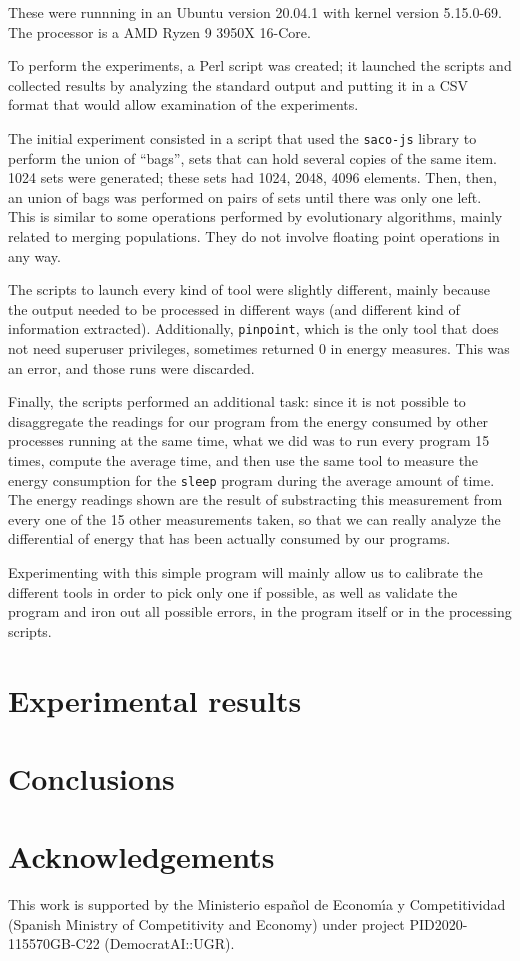 \documentclass[a4paper,twoside]{article}
\begin{document}
These were runnning in an Ubuntu version 20.04.1 with kernel version
5.15.0-69. The processor is a AMD Ryzen 9 3950X 16-Core.

To perform the experiments, a Perl script was created; it launched the scripts
and collected results by analyzing the standard output and putting it in a CSV
format that would allow examination of the experiments.

The initial experiment consisted in a script that used the \texttt{saco-js}
library to perform the union of ``bags'', sets that can hold several copies of
the same item. 1024 sets were generated; these sets had 1024, 2048, 4096
elements. Then, then, an union of bags was performed on pairs of sets until
there was only one left. This is similar to some operations performed by
evolutionary algorithms, mainly related to merging populations. They do not
involve floating point operations in any way.

The scripts to launch every kind of tool were slightly different, mainly because
the output needed to be processed in different ways (and different kind of
information extracted). Additionally, \texttt{pinpoint}, which is the only tool
that does not need superuser privileges, sometimes returned 0 in energy
measures. This was an error, and those runs were discarded.

Finally, the scripts performed an additional task: since it is not possible to
disaggregate the readings for our program from the energy consumed by other
processes running at the same time, what we did was to run every program 15
times, compute the average time, and then use the same tool to measure the
energy consumption for the \texttt{sleep} program during the average amount of
time. The energy readings shown are the result of substracting this measurement
from every one of the 15 other measurements taken, so that we can really analyze
the differential of energy that has been actually consumed by our programs.

Experimenting with this simple program will mainly allow us to calibrate the
different tools in order to pick only one if possible, as well as validate the
program and iron out all possible errors, in the program itself or in the
processing scripts.

\section{Experimental results}
\label{sec:res}

\section{Conclusions}
\label{sec:conc}

\section*{Acknowledgements}

This work is supported by the Ministerio espa\~{n}ol de Econom\'{\i}a y
Competitividad (Spanish Ministry of Competitivity and Economy) under project
PID2020-115570GB-C22 (DemocratAI::UGR).



{\small
}
\end{document}
